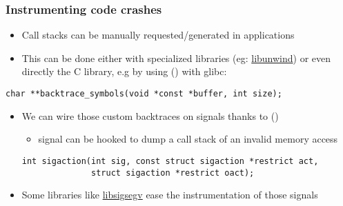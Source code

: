 \begin{frame}[fragile]
  \frametitle{Instrumenting code crashes}
  \begin{itemize}
      \item Call stacks can be manually requested/generated in applications
      \item This can be done either with specialized libraries (eg:
        \href{https://www.nongnu.org/libunwind/man/libunwind(3).html}{libunwind})
        or even directly the C library, e.g by using 
        () with glibc:
  \end{itemize}
    \begin{block}{}
      \begin{verbatim}
char **backtrace_symbols(void *const *buffer, int size);
      \end{verbatim}
    \end{block}

  \begin{itemize}
    \item We can wire those custom backtraces on signals thanks to
       ()
      \begin{itemize}
        \item {} signal can be hooked to dump a call stack of
          an invalid memory access
        \end{itemize}
    \begin{block}{}
      \begin{verbatim}
int sigaction(int sig, const struct sigaction *restrict act,
              struct sigaction *restrict oact);
      \end{verbatim}
    \end{block}
  \item Some libraries like
    \href{https://www.gnu.org/software/libsigsegv/}{libsigsegv} ease the
      instrumentation of those signals
  \end{itemize}
\end{frame}


